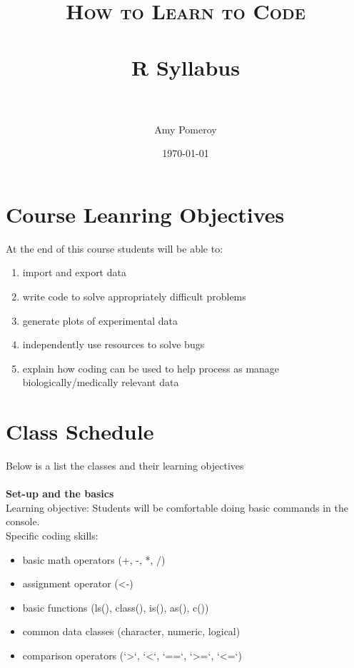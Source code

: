 \documentclass[paper=a4, fontsize=11pt]{scrartcl} %
\title{	
\normalfont \normalsize 
\textsc{How to Learn to Code} \\ [25pt] %
\horrule{0.5pt} \\[0.4cm] %
\huge R Syllabus \\ %
\horrule{2pt} \\[0.5cm] %
}
\author{Amy Pomeroy} %
\date{\normalsize\today} %
\numberwithin{equation}{section} %
\numberwithin{figure}{section} %
\numberwithin{table}{section} %
\begin{document}
\maketitle %


\section{Course Leanring Objectives}

At the end of this course students will be able to:

\begin{enumerate}
\item import and export data
\item write code to solve appropriately difficult problems 
\item generate plots of experimental data
\item independently use resources to solve bugs
\item explain how coding can be used to help process as manage biologically/medically relevant data
\end{enumerate}


\section{Class Schedule}

Below is a list the classes and their learning objectives \\ \\

\textbf{Set-up and the basics} \\
Learning objective: Students will be comfortable doing basic commands in the console. \\
Specific coding skills:
\begin{itemize}
	\item{basic math operators (+, -, *, /)}
	\item{assignment operator (<-)}
	\item{basic functions (ls(), class(), is(), as(), c())}
	\item{common data classes (character, numeric, logical)}
	\item{comparison operators (`>`, `<`, `==`, `>=`, `<=`)}
\end{itemize}  
\end{document}
